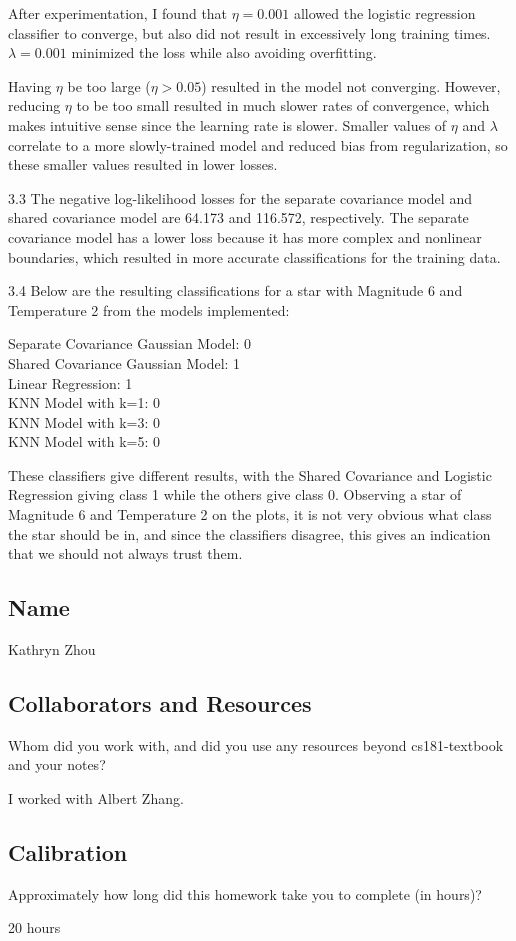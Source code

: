 \documentclass[submit]{harvardml}
\begin{document}
After experimentation, I found that $\eta = 0.001$ allowed the logistic regression classifier to converge, but also did not result in excessively long training times. $\lambda = 0.001$ minimized the loss while also avoiding overfitting.

Having $\eta$ be too large ($\eta > 0.05$) resulted in the model not converging. However, reducing $\eta$ to be too small resulted in much slower rates of convergence, which makes intuitive sense since the learning rate is slower. Smaller values of $\eta$ and $\lambda$ correlate to a more slowly-trained model and reduced bias from regularization, so these smaller values resulted in lower losses.

3.3 The negative log-likelihood losses for the separate covariance model and shared covariance model are 64.173 and 116.572, respectively. The separate covariance model has a lower loss because it has more complex and nonlinear boundaries, which resulted in more accurate classifications for the training data.

3.4 
Below are the resulting classifications for a star with Magnitude 6 and Temperature 2 from the models implemented:

Separate Covariance Gaussian Model: 0\\
Shared Covariance Gaussian Model: 1\\
Linear Regression: 1\\
KNN Model with k=1: 0\\
KNN Model with k=3: 0\\
KNN Model with k=5: 0

These classifiers give different results, with the Shared Covariance and Logistic Regression giving class 1 while the others give class 0. Observing a star of Magnitude 6 and Temperature 2 on the plots, it is not very obvious what class the star should be in, and since the classifiers disagree, this gives an indication that we should not always trust them.

\newpage
\subsection*{Name}
Kathryn Zhou

\subsection*{Collaborators and Resources}
Whom did you work with, and did you use any resources beyond cs181-textbook and your notes?

I worked with Albert Zhang. 

\subsection*{Calibration}
Approximately how long did this homework take you to complete (in hours)?

20 hours
\end{document}

